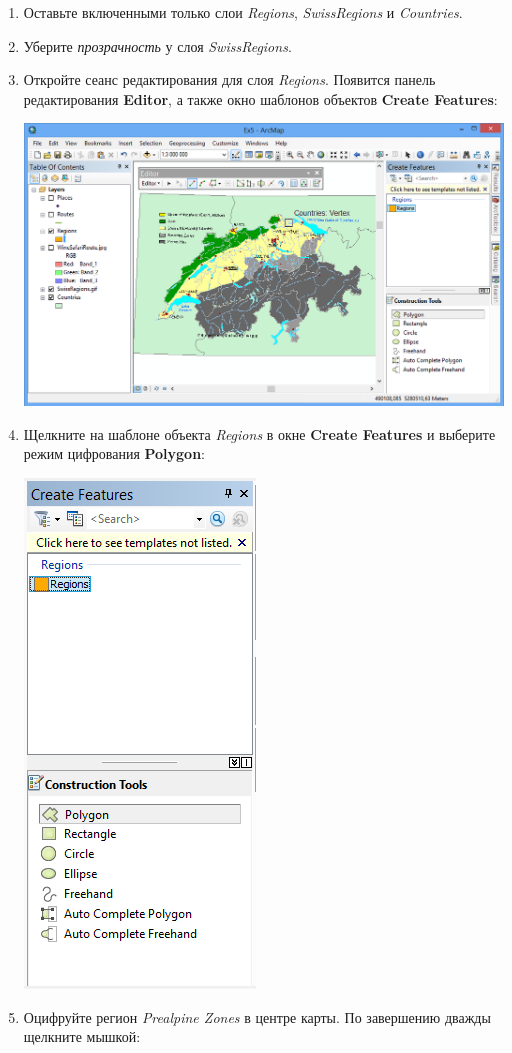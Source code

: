 \documentclass[]{book}
\theoremstyle{definition}
\theoremstyle{definition}
\theoremstyle{definition}
\theoremstyle{remark}
\begin{document}
\begin{enumerate}
\def\labelenumi{\arabic{enumi}.}
\item
  Оставьте включенными только слои \emph{Regions}, \emph{SwissRegions} и
  \emph{Countries}.
\item
  Уберите \emph{прозрачность} у слоя \emph{SwissRegions}.
\item
  Откройте сеанс редактирования для слоя \emph{Regions}. Появится панель
  редактирования \textbf{Editor}, а также окно шаблонов объектов
  \textbf{Create Features}:

  \includegraphics{images/Ex05/image15.png}
\item
  Щелкните на шаблоне объекта \emph{Regions} в окне \textbf{Create
  Features} и выберите режим цифрования \textbf{Polygon}:

  \includegraphics{images/Ex05/image16.png}
\item
  Оцифруйте регион \emph{Prealpine Zones} в центре карты. По завершению
  дважды щелкните мышкой:


\end{enumerate}
\end{document}
